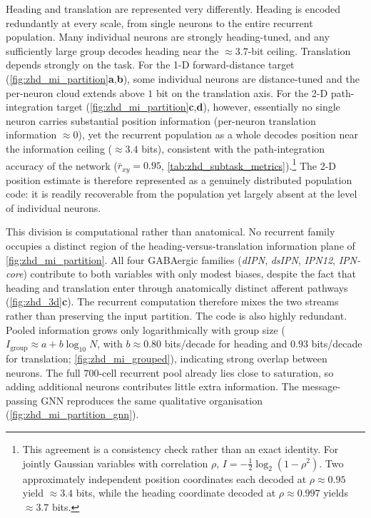 \documentclass[11pt]{article}
\begin{document}
Heading and translation are represented very differently. Heading is encoded redundantly at every scale, from single neurons to the entire recurrent population. Many individual neurons are strongly heading-tuned, and any sufficiently large group decodes heading near the $\approx 3.7$-bit ceiling. Translation depends strongly on the task. For the 1-D forward-distance target (\cref{fig:zhd_mi_partition}\textbf{a},\textbf{b}), some individual neurons are distance-tuned and the per-neuron cloud extends above $1$ bit on the translation axis. For the 2-D path-integration target (\cref{fig:zhd_mi_partition}\textbf{c},\textbf{d}), however, essentially no single neuron carries substantial position information (per-neuron translation information $\approx 0$), yet the recurrent population as a whole decodes position near the information ceiling ($\approx 3.4$ bits), consistent with the path-integration accuracy of the network ($\bar r_{xy}=0.95$, \cref{tab:zhd_subtask_metrics}).\footnote{This agreement is a consistency check rather than an exact identity. For jointly Gaussian variables with correlation $\rho$, $I=-\tfrac12\log_2(1-\rho^2)$. Two approximately independent position coordinates each decoded at $\rho\approx0.95$ yield $\approx3.4$ bits, while the heading coordinate decoded at $\rho\approx0.997$ yields $\approx3.7$ bits.} The 2-D position estimate is therefore represented as a genuinely distributed population code: it is readily recoverable from the population yet largely absent at the level of individual neurons.

This division is computational rather than anatomical. No recurrent family occupies a distinct region of the heading-versus-translation information plane of \cref{fig:zhd_mi_partition}. All four GABAergic families (\emph{dIPN}, \emph{dsIPN}, \emph{IPN12}, \emph{IPN-core}) contribute to both variables with only modest biases, despite the fact that heading and translation enter through anatomically distinct afferent pathways (\cref{fig:zhd_3d}\textbf{c}). The recurrent computation therefore mixes the two streams rather than preserving the input partition. The code is also highly redundant. Pooled information grows only logarithmically with group size ($I_{\mathrm{group}}\approx a+b\log_{10}N$, with $b\approx0.80$ bits/decade for heading and $0.93$ bits/decade for translation; \cref{fig:zhd_mi_grouped}), indicating strong overlap between neurons. The full $700$-cell recurrent pool already lies close to saturation, so adding additional neurons contributes little extra information. The message-passing GNN reproduces the same qualitative organisation (\cref{fig:zhd_mi_partition_gnn}).
\end{document}
